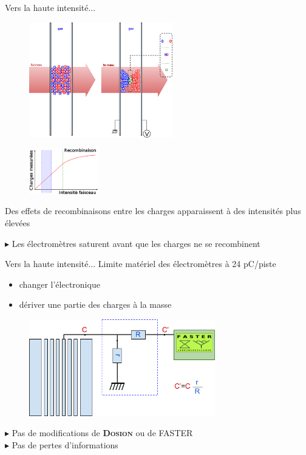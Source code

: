 \documentclass[10pt]{beamer}
\newcommand{\dosion}{\textbf{\textsc{Dosion}}\xspace}
\begin{document}
\begin{frame}[fragile]{Vers la haute intensité...}
\begin{minipage}[h]{.5\linewidth}
\begin{figure}[t]
\begin{center}
\includegraphics[height=5cm]{IC_hd.png} 
\end{center}
\end{figure}
\end{minipage}
\hfill
\begin{minipage}[h]{.48\linewidth}
\begin{figure}[h]
\begin{center}
\includegraphics[width=3cm]{Ch_hd.png}
\end{center}
\end{figure}
\vspace{2ex}
Des effets de recombinaisons entre les charges apparaissent à des intensités plus élevées 
\end{minipage}

$\blacktriangleright$ Les électromètres saturent \alert{avant} que les charges ne se recombinent
\end{frame}

\begin{frame}[fragile]{Vers la haute intensité...}
Limite matériel des électromètres à 24 pC/piste
\begin{itemize}
\item changer l'électronique
\item \alert{dériver une partie des charges à la masse}
\end{itemize}
\begin{figure}[h]
\begin{center}
\includegraphics[height=4.2cm]{Deriv.png}
\end{center}
\end{figure}
$\blacktriangleright$ Pas de modifications de \dosion ou de FASTER\\
$\blacktriangleright$ Pas de pertes d'informations
\end{frame}
\end{document}
